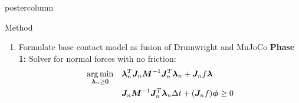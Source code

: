 \documentclass[final,hyperref={pdfpagelabels=false},5pt]{beamer}
\DeclareMathOperator*{\argmin}{arg\,min}
\begin{document}
\begin{frame}
\begin{columns}
\begin{column}{.49\textwidth}
\begin{beamercolorbox}[center,wd=\textwidth]{postercolumn}
\begin{minipage}[T]{.95\textwidth}
{            \begin{block}{Method}
              \begin{enumerate}
                  \item Formulate base contact model as fusion of Drumwright \cite{Drumwrighta} and MuJoCo \cite{Todorov}
                      \textbf{Phase 1:} Solver for normal forces with no friction:
                      \begin{align*}
                          \argmin _{\NormalForce \geq \vect 0} \quad &\NormalForce^T \Jn \Mass^{-1} \Jn ^T \NormalForce + \Jn f \Force \\
                                                            & \Jn \Mass^{-1} \Jn ^T \NormalForce \Delta t + (\Jn f) \Gap \geq 0
                      \end{align*}


\end{enumerate}
\end{block}}
\end{minipage}
\end{beamercolorbox}
\end{column}
\end{columns}
\end{frame}
\end{document}
